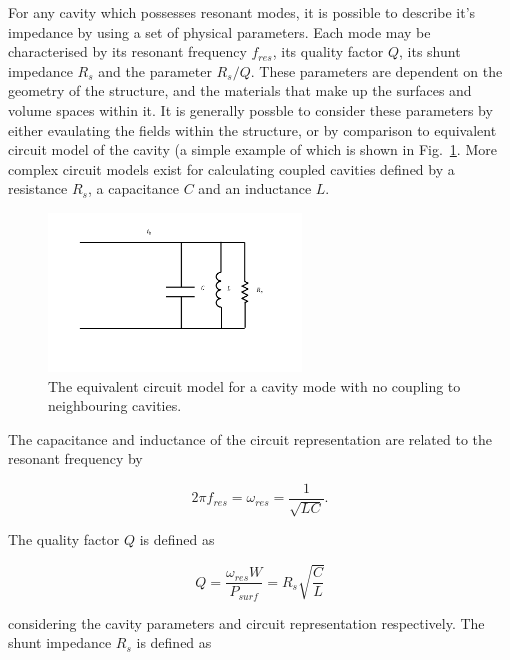 \label{app:ferr_Prop}

For any cavity which possesses resonant modes, it is possible to describe it's impedance by using a set of physical parameters. Each mode may be characterised by its resonant frequency $f_{res}$, its quality factor $Q$, its shunt impedance $R_{s}$ and the parameter $R_{s}/Q$. These parameters are dependent on the geometry of the structure, and the materials that make up the surfaces and volume spaces within it. It is generally possble to consider these parameters by either evaulating the fields within the structure, or by comparison to equivalent circuit model of the cavity (a simple example of which is shown in Fig.~\ref{fig:cavCircuitModel}. More complex circuit models exist for calculating coupled cavities \cite{Knapp:CoupledResModel} defined by a resistance $R_{s}$, a capacitance $C$ and an inductance $L$.

\begin{figure}
\begin{center}
\includegraphics[width=0.6\textwidth]{appendices/figures/equiv-circuit.pdf}
\end{center}
\caption{The equivalent circuit model for a cavity mode with no coupling to neighbouring cavities.}
\label{fig:cavCircuitModel}
\end{figure}

The capacitance and inductance of the circuit representation are related to the resonant frequency by

\begin{equation}
2\pi f_{res} = \omega_{res} = \frac{1}{\sqrt{LC}}.
\end{equation}

The quality factor $Q$ is defined as

\begin{equation}
Q = \frac{\omega_{res}W}{P_{surf}} = R_{s}\sqrt{\frac{C}{L}}
\end{equation}

considering the cavity parameters and circuit representation respectively. The shunt impedance $R_{s}$ is defined as

